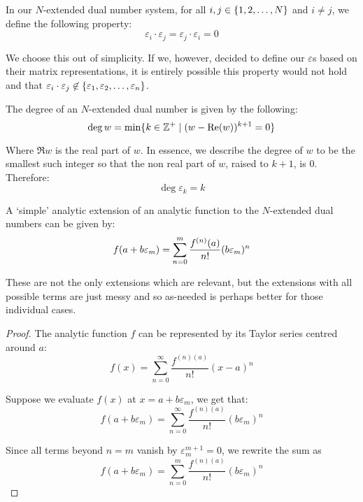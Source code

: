 \begin{theorem}
    In our $N$-extended dual number system, for all $i,j\in\{1,2,\dots,N\}$ and $i\neq j$, we define the following property:
    $$
        \varepsilon_i\cdot\varepsilon_j=\varepsilon_j\cdot\varepsilon_i=0
    $$

    We choose this out of simplicity. If we, however, decided to define our $\varepsilon$s based on their matrix representations, it is entirely possible this property would not hold and that $\varepsilon_i\cdot \varepsilon_j\not\in\{\varepsilon_1,\varepsilon_2,\dots,\varepsilon_n\}$.
\end{theorem}

\begin{theorem}
    The degree of an $N$-extended dual number is given by the following:
    $$
        \deg{w}=\min\br{k\in\mathbb{Z}^+\mid (w-\Re{w})^{k+1}=0}
    $$

    Where $\Re{w}$ is the real part of $w$. In essence, we describe the degree of $w$ to be the smallest such integer so that the non real part of $w$, raised to $k+1$, is 0. Therefore:
    $$
        \deg{\varepsilon_k}=k
    $$
\end{theorem}

\begin{theorem}
    A `simple' analytic extension of an analytic function to the $N$-extended dual numbers can be given by:
    $$
        f(a+b\varepsilon_m)=\sum_{n=0}^{m}{\frac{f^{(n)}(a)}{n!}(b\varepsilon_m)^n}
    $$

    These are not the only extensions which are relevant, but the extensions with all possible terms are just messy and so as-needed is perhaps better for those individual cases.
    \begin{proof}
        The analytic function $f$ can be represented by its Taylor series centred around $a$:
        $$
            f(x) = \sum_{n=0}^{\infty}{\frac{f^{(n)(a)}}{n!}(x-a)^n}
        $$

        Suppose we evaluate $f(x)$ at $x=a+b\varepsilon_m$, we get that:
        $$
            f(a+b\varepsilon_m) = \sum_{n=0}^{\infty}{\frac{f^{(n)(a)}}{n!}(b\varepsilon_m)^n}
        $$

        Since all terms beyond $n=m$ vanish by $\varepsilon_m^{m+1}=0$, we rewrite the sum as
        $$
            f(a+b\varepsilon_m) = \sum_{n=0}^{m}{\frac{f^{(n)(a)}}{n!}(b\varepsilon_m)^n}
        $$
    \end{proof}
\end{theorem}

